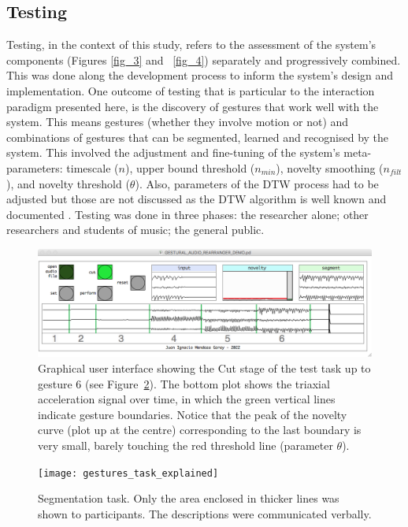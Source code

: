 \documentclass{nime-alternate_MANUSCRIPT} %
\begin{document}
\subsection{Testing}\label{Testing}

Testing, in the context of this study, refers to the assessment of the system’s components (Figures \ref{fig_3} and ~\ref{fig_4}) separately and progressively combined. This was done along the development process to inform the system’s design and implementation. One outcome of testing that is particular to the interaction paradigm presented here, is the discovery of gestures that work well with the system. This means gestures (whether they involve motion or not) and combinations of gestures that can be segmented, learned and recognised by the system. This involved the adjustment and fine-tuning of the system’s meta-parameters: timescale ($n$), upper bound threshold ($n_{min}$), novelty smoothing ($n_{filt}$), and novelty threshold ($\theta$). Also, parameters of the DTW process had to be adjusted but those are not discussed as the DTW algorithm is well known and documented \cite{Gillian_etal_2011, Wekinator_website}. Testing was done in three phases: the researcher alone; other researchers and students of music; the general public.

\begin{figure}[t!]
	\centering
		\includegraphics[trim={0.35cm 1.4cm 0.7cm 1.5cm}, clip=true, width=1\textwidth]{GUI_Cut_task}
\caption{Graphical user interface showing the Cut stage of the test task up to gesture 6 (see Figure~\ref{fig_6}). The bottom plot shows the triaxial acceleration signal over time, in which the green vertical lines indicate gesture boundaries. Notice that the peak of the novelty curve (plot up at the centre) corresponding to the last boundary is very small, barely touching the red threshold line (parameter $\theta$).}
	\label{fig_5}
\end{figure}

\begin{figure}[t!]
	\centering
		\texttt{[image: gestures\_task\_explained]}
	\caption{Segmentation task. Only the area enclosed in thicker lines was shown to participants. The descriptions were communicated verbally.}
	\label{fig_6}
\end{figure}
\end{document}
